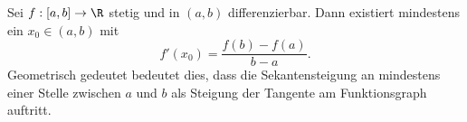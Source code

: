 Sei $f: [a, b] \to \R$ stetig und in $(a, b)$ differenzierbar. Dann existiert mindestens ein $x_0 \in (a, b)$ mit
$$f'(x_0) = \frac{f(b)-f(a)}{b-a}.$$
Geometrisch gedeutet bedeutet dies, dass die Sekantensteigung an mindestens einer Stelle zwischen $a$ und $b$ als Steigung der Tangente am Funktionsgraph auftritt. 